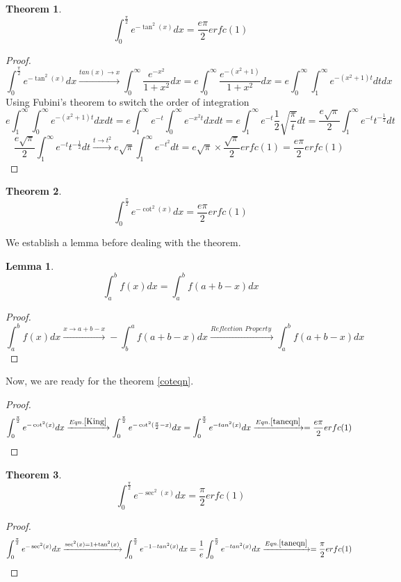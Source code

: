 \documentclass[a4paper,twoside,10pt]{article}
\newtheorem{theorem}{Theorem}[section]
\newtheorem{lemma}{Lemma}[theorem]
\begin{document}
 \begin{theorem}
\begin{equation}\label{taneqn}
 \int_0^{\frac{\pi}{2}} e^{-\tan^2(x)} dx = \frac{e\pi}{2}erfc(1)  
\end{equation}
\end{theorem}
\begin{proof}
\[ \int_0^{\frac{\pi}{2}} e^{-\tan^2(x)} dx \xrightarrow{tan(x)\rightarrow x} \int_0^{\infty} \frac{e^{-x^2}}{1+x^2} dx = e \int_0^{\infty} \frac{e^{-(x^2+1)}}{1+x^2} dx = e\int_0^{\infty} \int_1^{\infty} e^{-(x^2+1) t} dt dx \]
Using Fubini's theorem to switch the order of integration
\[ e\int_1^{\infty} \int_0^{\infty} e^{-(x^2+1)t} dx dt = e\int_1^{\infty}e^{-t} \int_0^{\infty} e^{-x^2t} dx dt = e\int_1^{\infty}e^{-t} \frac{1}{2}\sqrt{\frac{\pi}{t}} dt = \frac{e\sqrt{\pi}}{2}\int_1^{\infty}e^{-t} t^{-\frac{1}{2}} dt \]
\[ \frac{e\sqrt{\pi}}{2}\int_1^{\infty}e^{-t} t^{-\frac{1}{2}} dt \xrightarrow{t\rightarrow t^2} e\sqrt{\pi} \int_1^{\infty} e^{-t^2} dt = e\sqrt{\pi} \times \frac{\sqrt{\pi}}{2} erfc(1) = \frac{e\pi}{2} erfc(1) \,\,   \]
\end{proof}

 \begin{theorem}
\begin{equation}\label{coteqn}
  \int_0^{\frac{\pi}{2}} e^{-\cot^2(x)} dx = \frac{e\pi}{2}erfc(1)  
\end{equation}
\end{theorem}
We establish a lemma before dealing with the theorem. 
\begin{lemma}
\begin{equation}\label{King}
 \int_a^b f(x) dx = \int_a^b f(a+b-x) dx 
\end{equation}
\end{lemma}
\begin{proof}
\[ \int_a^b f(x) dx \xrightarrow{x\rightarrow a+b-x} -\int_b^a f(a+b-x)  dx \xrightarrow{Reflection\,\, Property\,\,} \int_a^b f(a+b-x) dx \]
\end{proof}
Now, we are ready for the theorem \eqref{coteqn}.\\
\begin{proof}
\[ \int_0^{\frac{\pi}{2}} e^{-\cot^2(x)} dx \xrightarrow{ Eqn. \eqref{King}}\int_0^{\frac{\pi}{2}} e^{-\cot^2(\frac{\pi}{2}-x)} dx = \int_0^{\frac{\pi}{2}} e^{-tan^2(x)} dx \xrightarrow{Eqn. \eqref{taneqn}}= \frac{e\pi}{2} erfc(1)  \,\,   \]
\end{proof}

 \begin{theorem}
\begin{equation}\label{seceqn}
  \int_0^{\frac{\pi}{2}} e^{-\sec^2(x)} dx = \frac{\pi}{2}erfc(1)  
\end{equation}
\end{theorem}
\begin{proof}
\[ \int_0^{\frac{\pi}{2}} e^{-\sec^2(x)} dx \xrightarrow{\sec^2(x)=1+\tan^2(x)}\int_0^{\frac{\pi}{2}} e^{-1-tan^2(x)} dx =\frac{1}{e} \int_0^{\frac{\pi}{2}} e^{-tan^2(x)} dx \xrightarrow{Eqn. \eqref{taneqn}} = \frac{\pi}{2} erfc(1) \,\,   \]
\end{proof}
\end{document}
